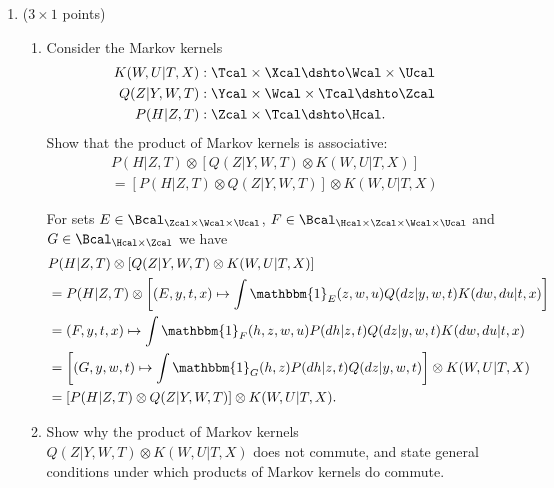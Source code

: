 \begin{enumerate}
\begin{gradedsolution}
\begin{enumerate}
    \item Intersection: For the following part, assume that p is strictly positive, i.e. for all values $x,y,z,u$ we have that $p(x, y, z, u) > 0$. Then show that also the Intersection property holds:
    $$(X \Indep Y \;|\;U,Z) \land (X \Indep U \; | \; Y,Z)  \implies  X \Indep U,Y \; | \; Z.$$

    We are given $q(x|u,z)$, $q'(x|y,z)$ s.t.
    \begin{align*}
      p(x, u, y, z)&=q(x|u,z)p(u, y, z)\\
      &=q'(x|y,z)p(u,y, z)
    \end{align*}
    as $p$ is strictly positive, these equalities imply that $\forall x, u, y, z, q(x|u,z)=q'(x|y,z)$. A Markov kernel $q''(x|z)$ thus exists with $\forall x,u,y,z, q''(x|z)=q(x|u,z)=q'(x|y,z)$
  \end{enumerate}
\end{gradedsolution}

\item ($3 \times 1$ points)
\begin{enumerate}
  \item 
  Consider the Markov kernels
  \begin{align*}
    K(W, U | T, X)&: \Tcal\times \Xcal \dshto \Wcal \times \Ucal \\
    Q(Z | Y, W, T)&: \Ycal \times \Wcal \times \Tcal \dshto \Zcal \\
    P(H|Z, T)&: \Zcal \times \Tcal \dshto \Hcal.
  \end{align*}
  Show that the product of Markov kernels is associative:
  \begin{multline*}
    P(H|Z, T) \otimes \left[ Q(Z | Y, W, T) \otimes K(W, U|T, X) \right]\\
    = \left[P(H|Z, T) \otimes  Q(Z | Y, W, T) \right] \otimes K(W, U|T, X)
  \end{multline*}
  \begin{gradedsolution}
    For sets $E\in\Bcal_{\Zcal\times\Wcal \times\Ucal}$, $F\in\Bcal_{\Hcal\times\Zcal\times \Wcal \times \Ucal}$ and $G\in\Bcal_{\Hcal\times\Zcal}$ we have
    \begin{align*}
      &P(H|Z, T) \otimes \left[ Q(Z | Y, W, T) \otimes K(W, U|T, X) \right] \\
      & = P(H|Z, T) \otimes \left[(E, y, t, x) \mapsto \int \mathbbm{1}_{E}(z, w, u)Q(dz | y,w, t)K(dw, du| t, x) \right] \\
      & = (F, y, t, x) \mapsto \int \mathbbm{1}_{F}(h, z, w, u)P(dh|z, t)Q(dz | y,w, t)K(dw, du| t, x) \\
      & = \left[(G, y, w, t) \mapsto \int \mathbbm{1}_{G}(h, z)P(dh|z, t)Q(dz | y,w, t) \right] \otimes K(W, U|T, X) \\
      & = \left[P(H|Z, T) \otimes Q(Z | Y, W, T) \right] \otimes K(W, U|T, X).
    \end{align*}
  \end{gradedsolution}
  \item
  Show why the product of Markov kernels $Q(Z | Y, W, T) \otimes K(W, U|T, X)$ does not commute, and state general conditions under which products of Markov kernels do commute.


\end{enumerate}
\end{enumerate}
